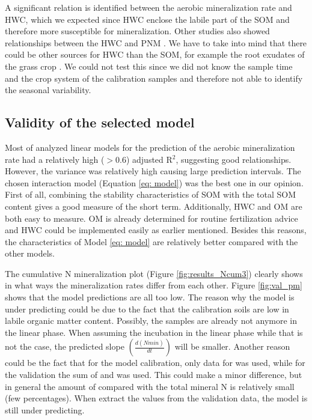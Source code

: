 \documentclass[10pt,twoside,dutch,english]{report}
\begin{document}
A significant relation is identified between the aerobic mineralization rate and HWC, which we expected since HWC enclose the labile part of the SOM \citep{Haynes2005, Hanegraaf2009} and therefore more susceptible for mineralization. Other studies also showed relationships between the HWC and PNM \citep{Ghani2003, Eekeren2010}. We have to take into mind that there could be other sources for HWC than the SOM, for example the root exudates of the grass crop \citep{Hanegraaf2009}. We could not test this since we did not know the sample time and the crop system of the calibration samples and therefore not able to identify the seasonal variability. 


   
\subsection{Validity of the selected model}
Most of analyzed linear models for the prediction of the aerobic mineralization rate had a relatively high ($>$0.6) adjusted R$^{2}$, suggesting good relationships. However, the variance was relatively high causing large prediction intervals.  
The chosen interaction model (Equation \ref{eq: model}) was the best one in our opinion. First of all, combining the stability characteristics of SOM with the total SOM content gives a good measure of the short term. Additionally,  HWC and OM are both  easy to measure.  OM is already determined for routine fertilization advice and HWC could be implemented easily as earlier mentioned.  Besides this reasons, the characteristics of Model \ref{eq: model} are relatively better compared with the other models. 

The cumulative N mineralization plot (Figure \ref{fig:results_Ncum3}) clearly shows in what ways the mineralization rates differ from each other. Figure \ref{fig:val_pm} shows that the model predictions are all too low. The reason why the model is under predicting could be due to the fact that the calibration soils are low in labile organic matter content. Possibly, the samples are already not anymore in the linear phase. When assuming the incubation in the linear phase while that is not the case, the predicted slope $(\frac{d(Nmin)}{dt})$ will be smaller. 
Another reason could be the fact that for the model calibration, only data for  was used, while for the validation the sum of  and  was used. This could make a minor difference, but in general the amount of  compared with the total mineral N is relatively small (few percentages). When extract the  values from the validation data, the model is still under predicting. 
\end{document}
